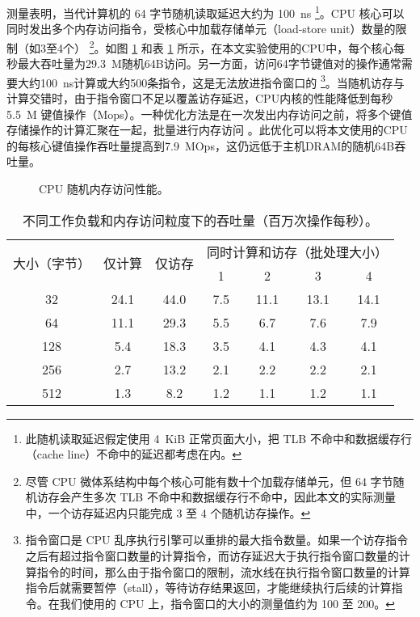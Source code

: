 测量表明，当代计算机的 64 字节随机读取延迟大约为 100~ns \footnote{此随机读取延迟假定使用 4~KiB 正常页面大小，把 TLB 不命中和数据缓存行（cache line）不命中的延迟都考虑在内。}。CPU 核心可以同时发出多个内存访问指令，受核心中加载存储单元（load-store unit）数量的限制（如3至4个） \cite {gharachorloo1992hiding,han2010packetshader,zhang2015mega} \footnote{尽管 CPU 微体系结构中每个核心可能有数十个加载存储单元，但 64 字节随机访存会产生多次 TLB 不命中和数据缓存行不命中，因此本文的实际测量中，一个访存延迟内只能完成 3 至 4 个随机访存操作。}。如图 \ref{kvdirect:fig:cpu-mem} 和表 \ref{kvdirect:tab:kv-cpu-throughput} 所示，在本文实验使用的CPU中，每个核心每秒最大吞吐量为29.3~M随机64B访问。另一方面，访问64字节键值对的操作通常需要大约100~ns计算或大约500条指令，这是无法放进指令窗口的 \footnote{指令窗口是 CPU 乱序执行引擎可以重排的最大指令数量。如果一个访存指令之后有超过指令窗口数量的计算指令，而访存延迟大于执行指令窗口数量的计算指令的时间，那么由于指令窗口的限制，流水线在执行指令窗口数量的计算指令后就需要暂停（stall），等待访存结果返回，才能继续执行后续的计算指令。在我们使用的 CPU 上，指令窗口的大小的测量值约为 100 至 200。}。当随机访存与计算交错时，由于指令窗口不足以覆盖访存延迟，CPU内核的性能降低到每秒5.5~M 键值操作（Mops）。一种优化方法是在一次发出内存访问之前，将多个键值存储操作的计算汇聚在一起，批量进行内存访问 \cite {li2016full,narula2014phase}。此优化可以将本文使用的CPU的每核心键值操作吞吐量提高到7.9~MOps，这仍远低于主机DRAM的随机64B吞吐量。


\begin{figure}[htbp]
	\centering
	\caption{CPU 随机内存访问性能。}
	\label{kvdirect:fig:cpu-mem}
\end{figure}


\begin{table}[htbp]
	\small
	\centering
	\caption{不同工作负载和内存访问粒度下的吞吐量（百万次操作每秒）。}
	\begin{tabular}{|c|c|c|c|c|c|c|}
		\hline
		\multirow{2}{*}{大小（字节）} & \multirow{2}{*}{仅计算} & \multirow{2}{*}{仅访存} & \multicolumn{4}{c|}{同时计算和访存（批处理大小）} \\\cline{4-7} 
		&  & & 1 & 2 & 3 & 4 \\\hline
		32 & 24.1 & 44.0 & 7.5 & 11.1 & 13.1 & 14.1 \\\hline
		64 & 11.1 & 29.3 & 5.5 & 6.7 & 7.6 & 7.9 \\\hline
		128 & 5.4 & 18.3 & 3.5 & 4.1 & 4.3 & 4.1 \\\hline
		256 & 2.7 & 13.2 & 2.1 & 2.2 & 2.2 & 2.1 \\\hline
		512 & 1.3 & 8.2 & 1.2 & 1.1 & 1.2 & 1.1 \\\hline
	\end{tabular}
	\label{kvdirect:tab:kv-cpu-throughput}
\end{table}


